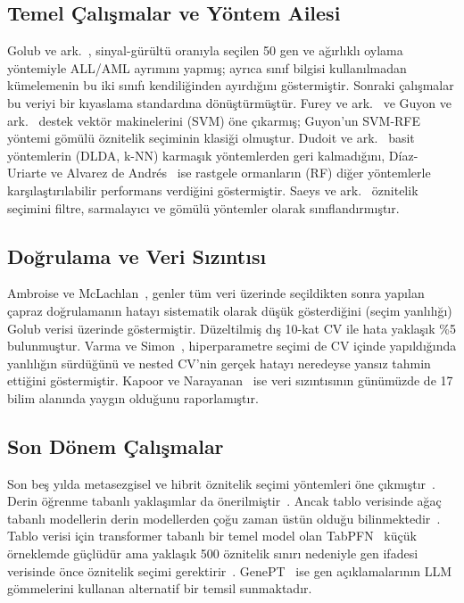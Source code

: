 \documentclass[conference]{IEEEtran}
\begin{document}
\subsection{Temel Çalışmalar ve Yöntem Ailesi}
Golub ve ark.~\cite{golub1999}, sinyal-gürültü oranıyla seçilen 50 gen ve ağırlıklı oylama yöntemiyle ALL/AML ayrımını yapmış; ayrıca sınıf bilgisi kullanılmadan kümelemenin bu iki sınıfı kendiliğinden ayırdığını göstermiştir. Sonraki çalışmalar bu veriyi bir kıyaslama standardına dönüştürmüştür. Furey ve ark.~\cite{furey2000} ve Guyon ve ark.~\cite{guyon2002} destek vektör makinelerini (SVM) öne çıkarmış; Guyon'un SVM-RFE yöntemi gömülü öznitelik seçiminin klasiği olmuştur. Dudoit ve ark.~\cite{dudoit2002} basit yöntemlerin (DLDA, k-NN) karmaşık yöntemlerden geri kalmadığını, Díaz-Uriarte ve Alvarez de Andrés~\cite{diaz2006} ise rastgele ormanların (RF) diğer yöntemlerle karşılaştırılabilir performans verdiğini göstermiştir. Saeys ve ark.~\cite{saeys2007} öznitelik seçimini filtre, sarmalayıcı ve gömülü yöntemler olarak sınıflandırmıştır.

\subsection{Doğrulama ve Veri Sızıntısı}
Ambroise ve McLachlan~\cite{ambroise2002}, genler tüm veri üzerinde seçildikten sonra yapılan çapraz doğrulamanın hatayı sistematik olarak düşük gösterdiğini (seçim yanlılığı) Golub verisi üzerinde göstermiştir. Düzeltilmiş dış 10-kat CV ile hata yaklaşık \%5 bulunmuştur. Varma ve Simon~\cite{varma2006}, hiperparametre seçimi de CV içinde yapıldığında yanlılığın sürdüğünü ve nested CV'nin gerçek hatayı neredeyse yansız tahmin ettiğini göstermiştir. Kapoor ve Narayanan~\cite{kapoor2023} ise veri sızıntısının günümüzde de 17 bilim alanında yaygın olduğunu raporlamıştır.

\subsection{Son Dönem Çalışmalar}
Son beş yılda metasezgisel ve hibrit öznitelik seçimi yöntemleri öne çıkmıştır~\cite{almazrua2022,elemam2022,osama2023,yaqoob2024}. Derin öğrenme tabanlı yaklaşımlar da önerilmiştir~\cite{alharbi2023,mallick2023}. Ancak tablo verisinde ağaç tabanlı modellerin derin modellerden çoğu zaman üstün olduğu bilinmektedir~\cite{grinsztajn2022}. Tablo verisi için transformer tabanlı bir temel model olan TabPFN~\cite{hollmann2025} küçük örneklemde güçlüdür ama yaklaşık 500 öznitelik sınırı nedeniyle gen ifadesi verisinde önce öznitelik seçimi gerektirir~\cite{zhou2025}. GenePT~\cite{chen2024} ise gen açıklamalarının LLM gömmelerini kullanan alternatif bir temsil sunmaktadır.
\end{document}
